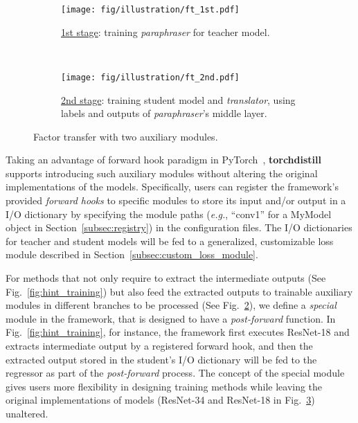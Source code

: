 \documentclass[runningheads]{llncs}
\newcommand{\FRAMEWORK}{{\bf torchdistill}\xspace}
\begin{document}
\begin{figure}[t]
    \centering
    \begin{subfigure}[b]{0.8\linewidth}
        \centering
        \texttt{[image: fig/illustration/ft\_1st.pdf]}
        \caption{\underline{1st stage}: training \emph{paraphraser} for teacher model.}
        \label{fig:ft_1st}
    \end{subfigure}
    \\ \vspace{1em}
    \begin{subfigure}[b]{0.8\linewidth}
        \centering 
        \texttt{[image: fig/illustration/ft\_2nd.pdf]}
        \caption{\underline{2nd stage}: training student model and \emph{translator}, using labels and outputs of \emph{paraphraser}'s middle layer.}
        \label{fig:ft_2nd}
    \end{subfigure}
    \vspace{-1em}
    \caption{Factor transfer with two auxiliary modules.} 
    \label{fig:ft}
\end{figure}

Taking an advantage of forward hook paradigm in PyTorch~\cite{paszke2019pytorch}, \FRAMEWORK supports introducing such auxiliary modules without altering the original implementations of the models.
Specifically, users can register the framework's provided \emph{forward hooks} to specific modules to store its input and/or output in a I/O dictionary by specifying the module paths (\emph{e.g.}, ``conv1'' for a MyModel object in Section~\ref{subsec:registry}) in the configuration files.
The I/O dictionaries for teacher and student models will be fed to a generalized, customizable loss module described in Section~\ref{subsec:custom_loss_module}.

For methods that not only require to extract the intermediate outputs (See Fig.~\ref{fig:hint_training}) but also feed the extracted outputs to trainable auxiliary modules in different branches to be processed (See Fig.~\ref{fig:ft_2nd}), we define a \emph{special} module in the framework, that is designed to have a \emph{post-forward} function.
In Fig.~\ref{fig:hint_training}, for instance, the framework first executes ResNet-18 and extracts intermediate output by a registered forward hook, and then the extracted output stored in the student's I/O dictionary will be fed to the regressor as part of the \emph{post-forward} process.
The concept of the special module gives users more flexibility in designing training methods while leaving the original implementations of models (ResNet-34 and ResNet-18 in Fig.~\ref{fig:ft}) unaltered.
\end{document}
